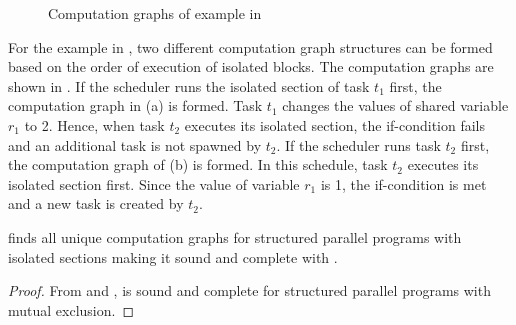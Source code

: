 \begin{figure}
  \caption{Computation graphs of example in }
  \vspace{-1em}
   \label{fig:cg-isolated}
\end{figure}

For the example in , two different computation graph structures can be formed based on the order of execution of isolated blocks. The computation graphs are shown in . If the scheduler runs the isolated section of task $t_1$ first, the computation graph in (a) is formed. Task $t_1$ changes the values of shared variable $r_1$ to 2. Hence, when task $t_2$ executes its isolated section, the if-condition fails and an additional task is not spawned by $t_2$. If the scheduler runs task $t_2$ first, the computation graph of (b) is formed. In this schedule, task $t_2$ executes its isolated section first. Since the value of variable $r_1$ is 1, the if-condition is met and a new task is created by $t_2$.

\begin{theorem}
 finds all unique computation graphs for structured parallel programs with isolated sections making it sound and complete with .
\end{theorem}

\begin{proof}
From  and ,  is sound and complete for structured parallel programs with mutual exclusion.
\end{proof}
